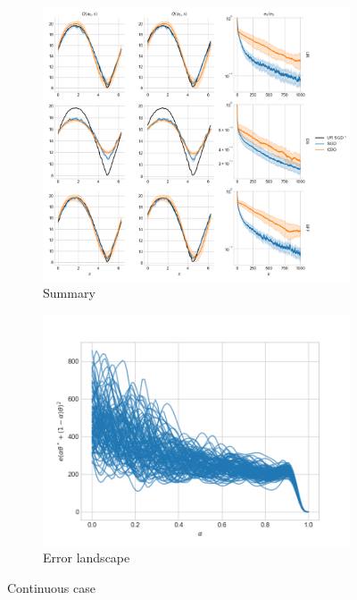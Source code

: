 \documentclass[10.5pt]{article}
\begin{document}
\begin{figure}[H]
    \centering
    \begin{subfigure}{.9\textwidth}
      \centering
      \includegraphics[width=\linewidth]{../figs/Q_ctrl_SGD_vs_CBO_summary_continuous_resnet.png}
      \caption{Summary}
      \label{fig:summary_cont}
    \end{subfigure}
    \begin{subfigure}{.5\textwidth}
      \centering
      \includegraphics[width=\linewidth]{../figs/Q_ctrl_landscape_plot_continuous_resnet.png}
      \caption{Error landscape}
      \label{fig:error_landscape_cont}
    \end{subfigure}
    \caption{Continuous case}
    \label{fig:cont}
\end{figure}
\end{document}
